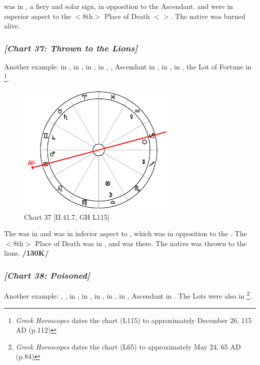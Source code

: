 \noindent \Mars\xspace was in \Leo, a fiery and solar sign, in opposition to the Ascendant. \Saturn\xspace and \Mercury\xspace were in superior aspect to the $<$8th$>$ Place of Death $<$\Pisces$>$. The native was burned alive.
\newpage
\subsubsection{\textit{[Chart 37: Thrown to the Lions]}}
Another example: \Sun\xspace in \Capricorn, \Moon\xspace in \Libra, \Saturn\xspace in \Taurus, \Jupiter\xspace in \Gemini, \Mars, Ascendant in \Cancer, \Venus\xspace in \Aquarius, \Mercury\xspace in \Sagittarius, the Lot of Fortune in \Libra
\footnote{\textit{Greek Horoscopes} dates the chart (L115) to approximately December 26, 115 AD (p.112)}. 

\clearpage
\begin{figure}
\centering
\vspace{-20pt}
\includegraphics[width=0.68\textwidth]{charts/2_41_7}
\caption{Chart 37 [II.41.7, GH L115]}
\label{fig:chart37}
\end{figure}

The \Moon\xspace was in \Libra\xspace and was in inferior aspect to \Mars, which was in opposition to the \Sun. The $<$8th$>$ Place of Death was in \Taurus, and \Saturn\xspace was there. The native was thrown to the lions. \textbf{/130K/} 
\newpage
\subsubsection{\textit{[Chart 38: Poisoned]}}
Another example: \Sun, \Moon, \Mercury\xspace in \Gemini, \Saturn\xspace in \Leo, \Jupiter\xspace in \Pisces, \Mars\xspace in \Cancer, \Venus\xspace in \Taurus, Ascendant in \Capricorn. The Lots were also in \Capricorn
\footnote{\textit{Greek Horoscopes} dates the chart (L65) to approximately May 24, 65 AD (p.84)}. 
 
